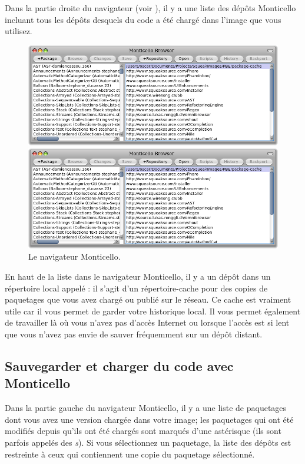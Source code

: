 \documentclass[a4paper,10pt,twoside]{book}
\begin{document}
Dans la partie droite du navigateur (voir ), il y a une liste des dépôts Monticello incluant tous les dépôts desquels du code a été chargé dans l'image que vous utilisez. 

\begin{figure}[hbt]
\ifluluelse
	{\centerline {\includegraphics[width=\textwidth]{MonticelloBrowser}}}
	{\centerline {\includegraphics[scale=0.7]{MonticelloBrowser}}}
\caption{Le navigateur Monticello.
\label{fig:monticello1}}
\end{figure}

En haut de la liste dans le navigateur Monticello, il y a un dépôt
dans un répertoire local appelé : il s'agit
d'un répertoire-cache pour des copies de paquetages que vous avez
chargé ou publié sur le réseau. Ce cache est vraiment utile car il
vous permet de garder votre historique local. Il vous permet également
de travailler là o\`u vous n'avez pas d'accès Internet ou lorsque 
l'accès est si lent que vous n'avez pas envie de sauver fréquemment 
sur un dépôt distant.

\subsection{Sauvegarder et charger du code avec Monticello}
Dans la partie gauche du navigateur Monticello, il y a une liste de
paquetages dont vous avez une version chargée dans votre image; les
paquetages qui ont été modifiés depuis qu'ils ont été chargés sont
marqués d'une 
astérisque
(ils sont parfois appelés des \emph{s}). Si vous sélectionnez un paquetage, la liste des dépôts est restreinte à ceux qui contiennent une copie du paquetage sélectionné.
\end{document}
